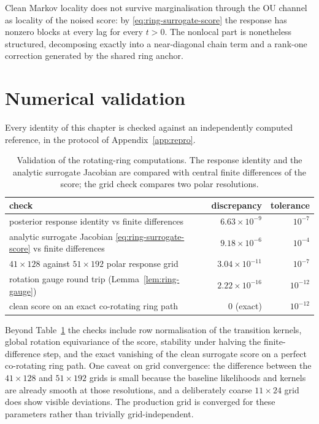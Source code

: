 \begin{proposition}
\label{prop:ring-surrogate-conclusion}
Clean Markov locality does not survive marginalisation through the OU channel
as locality of the noised score: by \eqref{eq:ring-surrogate-score} the
response has nonzero blocks at every lag for every $t > 0$. The nonlocal part
is nonetheless structured, decomposing exactly into a near-diagonal chain term
and a rank-one correction generated by the shared ring anchor.
\end{proposition}

\section{Numerical validation}\label{sec:ring-validation}

Every identity of this chapter is checked against an independently computed
reference, in the protocol of Appendix~\ref{app:repro}.

\begin{table}[t]\centering
\caption{Validation of the rotating-ring computations. The response identity
and the analytic surrogate Jacobian are compared with central finite
differences of the score; the grid check compares two polar resolutions.}
\label{tab:ring-validation}
\begin{tabular}{@{}lrr@{}}
\toprule
check & discrepancy & tolerance \\
\midrule
posterior response identity vs finite differences
  & $6.63\times10^{-9}$ & $10^{-7}$ \\
analytic surrogate Jacobian \eqref{eq:ring-surrogate-score} vs finite differences
  & $9.18\times10^{-6}$ & $10^{-4}$ \\
$41\times128$ against $51\times192$ polar response grid
  & $3.04\times10^{-11}$ & $10^{-7}$ \\
rotation gauge round trip (Lemma~\ref{lem:ring-gauge})
  & $2.22\times10^{-16}$ & $10^{-12}$ \\
clean score on an exact co-rotating ring path
  & $0$ (exact) & $10^{-12}$ \\
\bottomrule
\end{tabular}
\end{table}


Beyond Table~\ref{tab:ring-validation} the checks include row normalisation of
the transition kernels, global rotation equivariance of the score, stability
under halving the finite-difference step, and the exact vanishing of the clean
surrogate score on a perfect co-rotating ring path. One caveat on grid
convergence: the difference between the $41\times128$ and $51\times192$ grids
is small because the baseline likelihoods and kernels are already smooth at
those resolutions, and a deliberately coarse $11\times24$ grid does show
visible deviations. The production grid is converged for these parameters
rather than trivially grid-independent.

